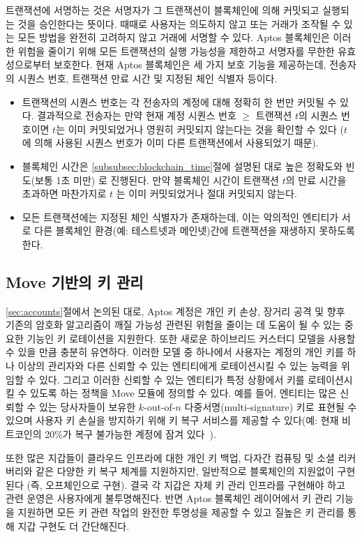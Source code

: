 \documentclass{article}
\begin{document}
트랜잭션에 서명하는 것은 서명자가 그 트랜잭션이 블록체인에 의해 커밋되고 실행되는 것을 승인한다는 뜻이다. 때때로 사용자는 의도하지 않고 또는 거래가 조작될 수 있는 모든 방법을 완전히 고려하지 않고 거래에 서명할 수 있다. Aptos 블록체인은 이러한 위험을 줄이기 위해 모든 트랜잭션의 실행 가능성을 제한하고 서명자를 무한한 유효성으로부터 보호한다. 현재 Aptos 블록체인은 세 가지 보호 기능을 제공하는데, 전송자의 시퀀스 번호, 트랜잭션 만료 시간 및 지정된 체인 식별자 등이다.
\begin{itemize}
    \item 트랜잭션의 시퀀스 번호는 각 전송자의 계정에 대해 정확히 한 번만 커밋될 수 있다. 결과적으로 전송자는 만약 현재 계정 시퀀스 번호  $\geq$ 트랜잭션 $t$의 시퀀스 번호이면 $t$는 이미 커밋되었거나 영원히 커밋되지 않는다는 것을 확인할 수 있다 ($t$ 에 의해 사용된 시퀀스 번호가 이미 다른 트랜잭션에서 사용되었기 때문).
    \item 블록체인 시간은 \ref{subsubsec:blockchain_time}절에 설명된 대로 높은 정확도와 빈도(보통 1초 미만) 로 진행된다. 만약 블록체인 시간이 트랜잭션 $t$의 만료 시간을 초과하면 마찬가지로 $t$ 는 이미 커밋되었거나 절대 커밋되지 않는다.
    \item 모든 트랜잭션에는 지정된 체인 식별자가 존재하는데, 이는 악의적인 엔티티가 서로 다른 블록체인 환경(예: 테스트넷과 메인넷)간에 트랜잭션을 재생하지 못하도록 한다.
\end{itemize}

\subsection{Move 기반의 키 관리}
\label{sub:move_based_key_management}

\ref{sec:accounts}절에서 논의된 대로, Aptos 계정은 개인 키 손상, 장거리 공격 및 향후 기존의 암호화 알고리즘이 깨질 가능성 관련된 위험을 줄이는 데 도움이 될 수 있는 중요한 기능인 키 로테이션을 지원한다. 또한 새로운 하이브리드 커스터디 모델을 사용할 수 있을 만큼 충분히 유연하다. 이러한 모델 중 하나에서 사용자는 계정의 개인 키를 하나 이상의 관리자와 다른 신뢰할 수 있는 엔티티에게 로테이션시킬 수 있는 능력을 위임할 수 있다. 그리고 이러한 신뢰할 수 있는 엔티티가 특정 상황에서 키를 로테이션시킬 수 있도록 하는 정책을 Move 모듈에 정의할 수 있다. 예를 들어, 엔티티는 많은 신뢰할 수 있는 당사자들이 보유한 $k$-out-of-$n$  다중서명(multi-signature) 키로 표현될 수 있으며 사용자 키 손실을 방지하기 위해 키 복구 서비스를 제공할 수 있다(예: 현재 비트코인의 20\%가 복구 불가능한 계정에 잠겨 있다~\cite{lost_passwords}).

또한 많은 지갑들이 클라우드 인프라에 대한 개인 키 백업, 다자간 컴퓨팅 및 소셜 리커버리와 같은 다양한 키 복구 체계를 지원하지만, 일반적으로 블록체인의 지원없이 구현된다 (즉, 오프체인으로 구현). 결국 각 지갑은 자체 키 관리 인프라를 구현해야 하고 관련 운영은 사용자에게 불투명해진다. 반면 Aptos 블록체인 레이어에서 키 관리 기능을 지원하면 모든 키 관련 작업의 완전한 투명성을 제공할 수 있고 질높은 키 관리를 통해 지갑 구현도 더 간단해진다.
\end{document}
